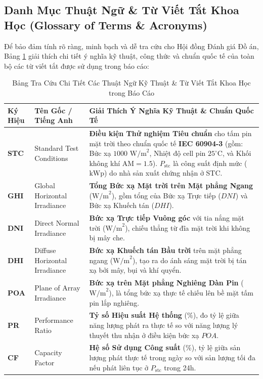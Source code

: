 \documentclass[12pt,a4paper]{article}
\begin{document}
\subsection{Danh Mục Thuật Ngữ \& Từ Viết Tắt Khoa Học (Glossary of Terms \& Acronyms)}
Để bảo đảm tính rõ ràng, minh bạch và dễ tra cứu cho Hội đồng Đánh giá Đồ án, Bảng \ref{tab:glossary} giải thích chi tiết ý nghĩa kỹ thuật, công thức và chuẩn quốc tế của toàn bộ các từ viết tắt được sử dụng trong báo cáo:

\begin{table}[H]
\centering
\caption{Bảng Tra Cứu Chi Tiết Các Thuật Ngữ Kỹ Thuật \& Từ Viết Tắt Khoa Học trong Báo Cáo}
\label{tab:glossary}
\small
\begin{tabularx}{\linewidth}{|l|l|X|}
\hline
\textbf{Ký Hiệu} & \textbf{Tên Gốc / Tiếng Anh} & \textbf{Giải Thích Ý Nghĩa Kỹ Thuật \& Chuẩn Quốc Tế} \\ \hline
\textbf{STC} & Standard Test Conditions & \textbf{Điều kiện Thử nghiệm Tiêu chuẩn} cho tấm pin mặt trời theo chuẩn quốc tế \textbf{IEC 60904-3} (gồm: Bức xạ $1000 \text{ W/m}^2$, Nhiệt độ cell pin $25^\circ\text{C}$, và Khối không khí $\text{AM} = 1.5$). $P_{\text{stc}}$ là công suất định mức ($\text{kWp}$) do nhà sản xuất chứng nhận ở STC. \\ \hline
\textbf{GHI} & Global Horizontal Irradiance & \textbf{Tổng Bức xạ Mặt trời trên Mặt phẳng Ngang} ($\text{W/m}^2$), gồm tổng của Bức xạ Trực tiếp ($DNI$) và Bức xạ Khuếch tán ($DHI$). \\ \hline
\textbf{DNI} & Direct Normal Irradiance & \textbf{Bức xạ Trực tiếp Vuông góc} với tia nắng mặt trời ($\text{W/m}^2$), chiếu thẳng từ đĩa mặt trời khi không bị mây che. \\ \hline
\textbf{DHI} & Diffuse Horizontal Irradiance & \textbf{Bức xạ Khuếch tán Bầu trời} trên mặt phẳng ngang ($\text{W/m}^2$), tạo ra do ánh sáng mặt trời bị tán xạ bởi mây, bụi và khí quyển. \\ \hline
\textbf{POA} & Plane of Array Irradiance & \textbf{Bức xạ trên Mặt phẳng Nghiêng Dàn Pin} ($\text{W/m}^2$), là tổng bức xạ thực tế chiếu lên bề mặt tấm pin lắp nghiêng. \\ \hline
\textbf{PR} & Performance Ratio & \textbf{Tỷ số Hiệu suất Hệ thống} (\%), đo tỷ lệ giữa năng lượng phát ra thực tế so với năng lượng lý thuyết thu nhận ở điều kiện bức xạ $POA$. \\ \hline
\textbf{CF} & Capacity Factor & \textbf{Hệ số Sử dụng Công suất} (\%), tỷ lệ giữa sản lượng phát thực tế trong ngày so với sản lượng tối đa nếu phát liên tục ở $P_{\text{stc}}$ trong 24h. \\ \hline

\end{tabularx}
\end{table}
\end{document}
